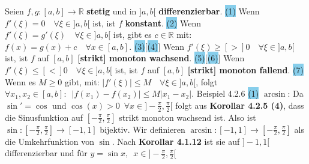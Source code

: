 \documentclass[landscape, 10pt]{article}
\newcommand{\R}{\mathbb{R}}
\begin{document}
\begin{multicols}{3}
                     Seien \textcolor{NavyBlue}{$f,g:[a,b]\longrightarrow\R$}
                     \textbf{stetig} und in \textcolor{NavyBlue}{$]a,b[$} 
                     \textbf{differenzierbar}.
                     \colorbox{SkyBlue}{(1)} Wenn 
                     \textcolor{NavyBlue}{$f'(\xi)=0\quad\forall\xi\in]a,b[$} ist, 
                     ist \textcolor{NavyBlue}{$f$} \textbf{konstant}. 
                     \colorbox{SkyBlue}{(2)} Wenn 
                     \textcolor{NavyBlue}{$f'(\xi)=g'(\xi)\quad\forall\xi\in]a,b[$} 
                     ist, gibt es \textcolor{NavyBlue}{$c\in\R$} mit: 
                     \textcolor{NavyBlue}{$f(x)=g(x)+c\quad\forall x\in[a,b]$}. 
                     \colorbox{SkyBlue}{(3)}[\colorbox{SkyBlue}{(4)}] 
                     Wenn \textcolor{NavyBlue}{
                     $f'(\xi)\geqslant[>]0\quad\forall\xi\in]a,b[$} ist, 
                     ist \textcolor{NavyBlue}{$f$} auf \textcolor{NavyBlue}{$[a,b]$} 
                     \textbf{[strikt] monoton wachsend}. 
                     \colorbox{SkyBlue}{(5)}[\colorbox{SkyBlue}{(6)}] 
                     Wenn \textcolor{NavyBlue}{
                     $f'(\xi)\leqslant[<]0\quad\forall\xi\in]a,b[$} ist, 
                     ist \textcolor{NavyBlue}{$f$} auf \textcolor{NavyBlue}{$[a,b]$} 
                     \textbf{[strikt] monoton fallend}. 
                     \colorbox{SkyBlue}{(7)} Wenn es 
                     \textcolor{NavyBlue}{$M\geqslant0$} gibt, mit: 
                     \textcolor{NavyBlue}{
                     $|f'(\xi)|\leqslant M\quad\forall\xi\in]a,b[$}, 
                     folgt \textcolor{NavyBlue}{ 
                     $\forall x_1,x_2\in[a,b]:\enspace
                     |f(x_1)-f(x_2)|\leqslant M|x_1-x_2|$}. 
                     \colorbox{Dandelion}{Beispiel 4.2.6}
                     \colorbox{SkyBlue}{(1)} $\arcsin$: Da $\sin'=\cos$ und 
                     $\cos(x)>0\enspace\forall x\in]-\frac{\pi}{2},\frac{\pi}{2}[$
                     folgt aus \textbf{Korollar 4.2.5 (4)}, dass die Sinusfunktion
                     auf $[-\frac{\pi}{2},\frac{\pi}{2}]$ strikt monoton wachsend
                     ist. Also ist 
                     $\sin:[-\frac{\pi}{2},\frac{\pi}{2}]\longrightarrow[-1,1]$ 
                     bijektiv. Wir definieren
                     $\arcsin:[-1,1]\longrightarrow[-\frac{\pi}{2},\frac{\pi}{2}]$
                     als die Umkehrfunktion von $\sin$. Nach 
                     \textbf{Korollar 4.1.12} 
                     ist sie auf $]-1,1[$ differenzierbar und für
                     $y=\sin x,\enspace x\in]-\frac{\pi}{2},\frac{\pi}{2}[$

\end{multicols}
\end{document}
